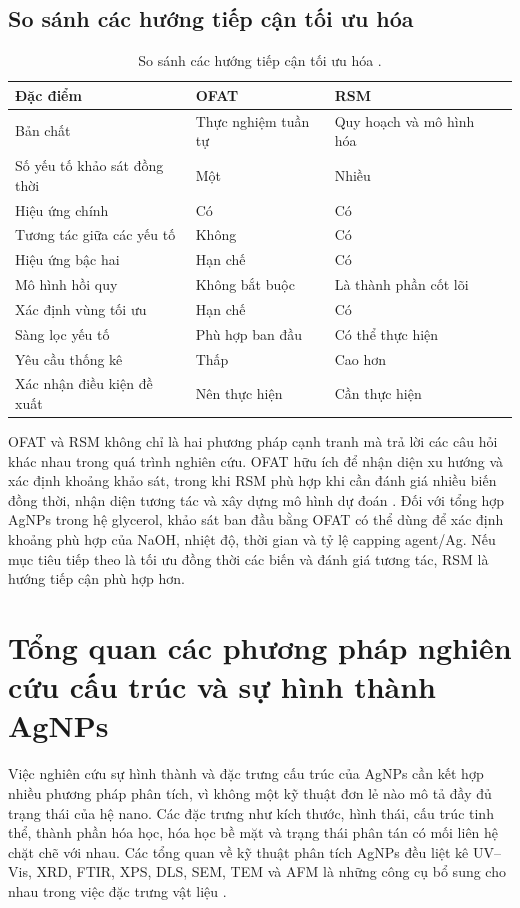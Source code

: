 \subsection{So sánh các hướng tiếp cận tối ưu hóa}
\begin{longtable}{@{}>{\raggedright\arraybackslash}p{}>{\raggedright\arraybackslash}p{}>{\raggedright\arraybackslash}p{}>{\raggedright\arraybackslash}p{}@{}}
\caption[So sánh các hướng tiếp cận tối ưu hóa]{So sánh các hướng tiếp cận tối ưu hóa \parencite{bezerra2008,montgomery2017}.}\\
Đặc điểm & OFAT & RSM \\
\hline
Bản chất & Thực nghiệm tuần tự & Quy hoạch và mô hình hóa \\
Số yếu tố khảo sát đồng thời & Một & Nhiều \\
Hiệu ứng chính & Có & Có \\
Tương tác giữa các yếu tố & Không & Có \\
Hiệu ứng bậc hai & Hạn chế & Có \\
Mô hình hồi quy & Không bắt buộc & Là thành phần cốt lõi \\
Xác định vùng tối ưu & Hạn chế & Có \\
Sàng lọc yếu tố & Phù hợp ban đầu & Có thể thực hiện \\
Yêu cầu thống kê & Thấp & Cao hơn \\
Xác nhận điều kiện đề xuất & Nên thực hiện & Cần thực hiện \\
\end{longtable}
\par
OFAT và RSM không chỉ là hai phương pháp cạnh tranh mà trả lời các câu hỏi khác nhau trong quá trình nghiên cứu.
OFAT hữu ích để nhận diện xu hướng và xác định khoảng khảo sát, trong khi RSM phù hợp khi cần đánh giá nhiều biến đồng thời, nhận diện tương tác và xây dựng mô hình dự đoán \parencite{bezerra2008}.
Đối với tổng hợp AgNPs trong hệ glycerol, khảo sát ban đầu bằng OFAT có thể dùng để xác định khoảng phù hợp của NaOH, nhiệt độ, thời gian và tỷ lệ capping agent/Ag.
Nếu mục tiêu tiếp theo là tối ưu đồng thời các biến và đánh giá tương tác, RSM là hướng tiếp cận phù hợp hơn.

\section{Tổng quan các phương pháp nghiên cứu cấu trúc và sự hình thành AgNPs}
Việc nghiên cứu sự hình thành và đặc trưng cấu trúc của AgNPs cần kết hợp nhiều phương pháp phân tích, vì không một kỹ thuật đơn lẻ nào mô tả đầy đủ trạng thái của hệ nano.
Các đặc trưng như kích thước, hình thái, cấu trúc tinh thể, thành phần hóa học, hóa học bề mặt và trạng thái phân tán có mối liên hệ chặt chẽ với nhau.
Các tổng quan về kỹ thuật phân tích AgNPs đều liệt kê UV--Vis, XRD, FTIR, XPS, DLS, SEM, TEM và AFM là những công cụ bổ sung cho nhau trong việc đặc trưng vật liệu \parencite{patil2021,pryshchepa2020,zhang2016}.


